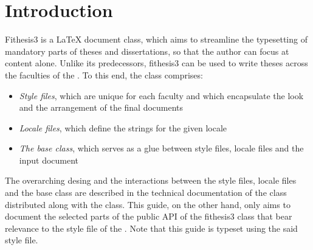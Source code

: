 \documentclass[color,table,cover,twoside,lot,lof]{../../fithesis3}
\begin{document}
  \makeatletter\thesis@blocks@titlePage\thesis@blocks@mainMatter\makeatother\setcounter{page}{161%
  }
  \chapter{Introduction} \textsf{Fithesis3} is a \LaTeX{} document
  class, which aims to streamline the typesetting of mandatory
  parts of theses and dissertations, so that the author can focus
  at content alone. Unlike its predecessors, \textsf{fithesis3} can
  be used to write theses across the faculties of the
  \makeatletter\thesis@english@universityName\makeatother. To this
  end, the class comprises:
  \begin{itemize}
    \item\emph{Style files}, which are unique for each faculty and
      which encapsulate the look and the arrangement of the final
      documents
    \item\emph{Locale files}, which define the strings for the
      given locale
    \item\emph{The base class}, which serves as a glue between
      style files, locale files and the input document
  \end{itemize}
  The overarching desing and the interactions between the style
  files, locale files and the base class are described in the
  technical documentation of the class \cite{novotny15} distributed
  along with the class. This guide, on the other hand, only aims to
  document the selected parts of the public API of the
  \textsf{fithesis3} class that bear relevance to the style file of
  the \makeatletter\thesis@english@facultyName\makeatother. Note
  that this guide is typeset using the said style file.
\end{document}
